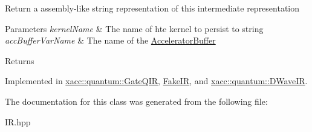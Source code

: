 Return a assembly-\/like string representation of this intermediate representation


\begin{DoxyParams}{Parameters}
{\em kernel\+Name} & The name of hte kernel to persist to string \\
\hline
{\em acc\+Buffer\+Var\+Name} & The name of the \hyperlink{a02444}{Accelerator\+Buffer} \\
\hline
\end{DoxyParams}
\begin{DoxyReturn}{Returns}

\end{DoxyReturn}


Implemented in \hyperlink{a01296_a7153f7e9f516d43af3d5d4f95d60bd86}{xacc\+::quantum\+::\+Gate\+Q\+IR}, \hyperlink{a02492_ac8b4fa63654de7830e2a6110559ffd87}{Fake\+IR}, and \hyperlink{a01268_ac19ad098d5bbfe769809c10e26ebebc6}{xacc\+::quantum\+::\+D\+Wave\+IR}.



The documentation for this class was generated from the following file\+:\begin{DoxyCompactItemize}
\item 
I\+R.\+hpp\end{DoxyCompactItemize}
